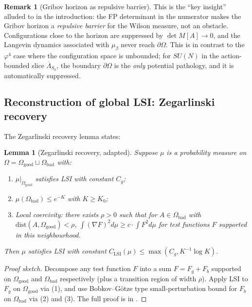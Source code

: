 \documentclass[11pt,a4paper]{amsart}
\newtheorem{lemma}[theorem]{Lemma}
\theoremstyle{definition}
\newtheorem{remark}[theorem]{Remark}
\begin{document}
\begin{remark}[Gribov horizon as repulsive barrier]\label{rem:horizon-repulsive}
This is the ``key insight'' alluded to in the introduction: the FP
determinant in the numerator makes the Gribov horizon a \emph{repulsive
barrier} for the Wilson measure, not an obstacle. Configurations close
to the horizon are suppressed by $\det M[A] \to 0$, and the Langevin
dynamics associated with $\mu_\beta$ never reach $\partial \Omega$.
This is in contrast to the $\varphi^4$ case where the configuration
space is unbounded; for $SU(N)$ in the action-bounded slice
$\overline\Lambda_{S_0}$, the boundary $\partial \Omega$ is the
\emph{only} potential pathology, and it is automatically suppressed.
\end{remark}

\subsection{Reconstruction of global LSI: Zegarlinski recovery}

The Zegarlinski recovery lemma \cite{Zegarlinski1996, BakryGentilLedoux2014} states:
\begin{lemma}[Zegarlinski recovery, adapted]\label{lem:zegarlinski-recover}
Suppose $\mu$ is a probability measure on $\Omega = \Omega_{\mathrm{good}} \sqcup \Omega_{\mathrm{bad}}$
with:
\begin{enumerate}[label=(\arabic*),leftmargin=2em]
\item $\mu|_{\Omega_{\mathrm{good}}}$ satisfies LSI with constant $C_g$;
\item $\mu(\Omega_{\mathrm{bad}}) \leq e^{-K}$ with $K \geq K_0$;
\item Local coercivity: there exists $\rho > 0$ such that for $A \in \Omega_{\mathrm{bad}}$
with $\mathrm{dist}(A, \Omega_{\mathrm{good}}) < \rho$,
$\int (\nabla F)^2 d\mu \geq c \cdot \int F^2 d\mu$ for test functions $F$
supported in this neighbourhood.
\end{enumerate}
Then $\mu$ satisfies LSI with constant
$C_{\mathrm{LSI}}(\mu) \leq \max(C_g, K^{-1} \log K)$.
\end{lemma}

\begin{proof}[Proof sketch]
Decompose any test function $F$ into a sum $F = F_g + F_b$ supported
on $\Omega_{\mathrm{good}}$ and $\Omega_{\mathrm{bad}}$ respectively
(plus a transition region of width $\rho$). Apply LSI to $F_g$ on
$\Omega_{\mathrm{good}}$ via (1), and use Bobkov--G\"otze type
small-perturbation bound for $F_b$ on $\Omega_{\mathrm{bad}}$ via
(2) and (3). The full proof is in \cite[\S 5]{Zegarlinski1996}.
\end{proof}
\end{document}
